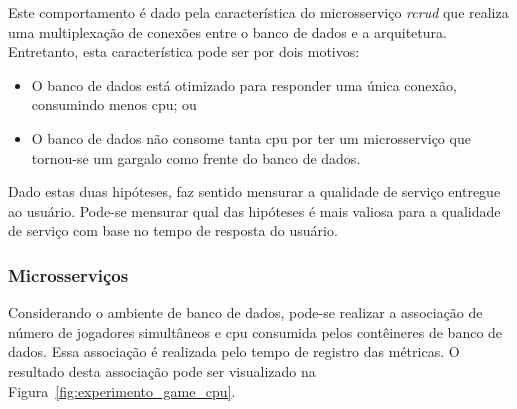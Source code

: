 Este comportamento é dado pela característica do microsserviço \textit{rcrud} que realiza uma multiplexação de conexões entre o banco de dados e a arquitetura.
%
Entretanto, esta característica pode ser por dois motivos:

\begin{itemize}
 \item O banco de dados está otimizado para responder uma única conexão, consumindo menos \ac{cpu}; ou
 \item O banco de dados não consome tanta \ac{cpu} por ter um microsserviço que tornou-se um gargalo como frente do banco de dados.
\end{itemize}

Dado estas duas hipóteses, faz sentido mensurar a qualidade de serviço entregue ao usuário.
%
Pode-se mensurar qual das hipóteses é mais valiosa para a qualidade de serviço com base no tempo de resposta do usuário.


\subsubsection{Microsserviços}

Considerando o ambiente de banco de dados, pode-se realizar a associação de número de jogadores simultâneos e \ac{cpu} consumida pelos contêineres de banco de dados.
%
Essa associação é realizada pelo tempo de registro das métricas.
%
O resultado desta associação pode ser visualizado na Figura~\ref{fig:experimento_game_cpu}.


